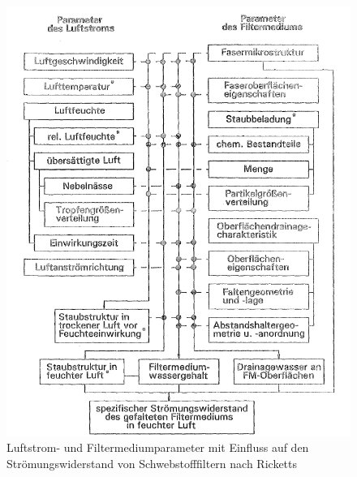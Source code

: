 \begin{figure}[H]
    \begin{center}
        \includegraphics[width=1.1\linewidth]{images/parameter.png}
        \caption[Einflussparameter Ricketts]{Luftstrom- und Filtermediumparameter mit Einfluss auf den Strömungswiderstand von Schwebstofffiltern nach Ricketts \cite{feuchte}}
        \label{fi:parameter}
    \end{center}
\end{figure}
